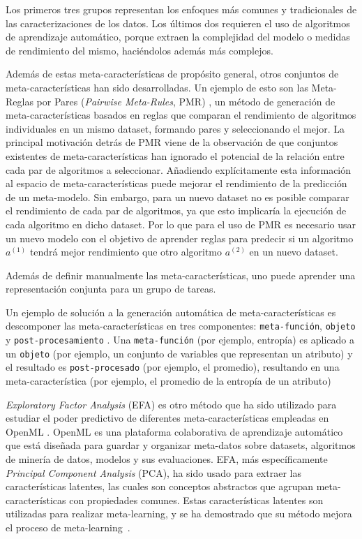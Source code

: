 Los primeros tres grupos representan los enfoques más comunes y tradicionales de las caracterizaciones de los datos. Los últimos dos requieren el uso de algoritmos de aprendizaje automático, porque extraen la complejidad del modelo o medidas de rendimiento del mismo, haciéndolos además más complejos.

Además de estas meta-características de propósito general, otros conjuntos de meta-características han sido desarrolladas. Un ejemplo de esto son las Meta-Reglas por Pares (\textit{Pairwise Meta-Rules}, PMR) \cite{sun2013pairwise}, un método de generación de meta-características basados en reglas que comparan el rendimiento de algoritmos individuales en un mismo dataset, formando pares y seleccionando el mejor. La principal motivación detrás de PMR viene de la observación de que conjuntos existentes de meta-características han ignorado el potencial de la relación entre cada par de algoritmos a seleccionar. Añadiendo explícitamente esta información al espacio de meta-características puede mejorar el rendimiento de la predicción de un meta-modelo. Sin embargo, para un nuevo dataset no es posible comparar el rendimiento de cada par de algoritmos, ya que esto implicaría la ejecución de cada algoritmo en dicho dataset. Por lo que para el uso de PMR es necesario usar un nuevo modelo con el objetivo de aprender reglas para predecir si un algoritmo $a^{(1)}$ tendrá mejor rendimiento que otro algoritmo $a^{(2)}$ en un nuevo dataset.

Además de definir manualmente las meta-características, uno puede aprender una representación conjunta para un grupo de tareas. 

Un ejemplo de solución a la generación automática de meta-características es descomponer las meta-características en tres componentes: \texttt{meta-función}, \texttt{objeto} y  \texttt{post-procesamiento} \cite{Pinto2016TowardsAG, pinto2014framework}. Una \texttt{meta-función} (por ejemplo, entropía) es aplicado a un \texttt{objeto} (por ejemplo, un conjunto de variables que representan un atributo) y el resultado es \texttt{post-procesado} (por ejemplo, el promedio), resultando en una meta-característica (por ejemplo, el promedio de la entropía de un atributo) %

\textit{Exploratory Factor Analysis} (EFA) es otro método que ha sido utilizado para estudiar el poder predictivo de diferentes meta-características empleadas en OpenML \cite{bilalli2017predictive}. OpenML es una plataforma colaborativa de aprendizaje automático que está diseñada para guardar y organizar meta-datos sobre datasets, algoritmos de minería de datos, modelos y sus evaluaciones. EFA, más específicamente \textit{Principal Component Analysis} (PCA), ha sido usado para extraer las características latentes, las cuales son conceptos abstractos que agrupan meta-características con propiedades comunes. Estas características latentes son utilizadas para realizar meta-learning, y se ha demostrado que su método mejora el proceso de meta-learning~\cite{bilalli2017predictive}.

